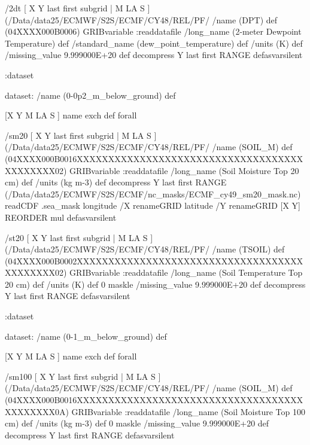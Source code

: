 \begin{ingrid}
/2dt { [ X Y last first subgrid | M LA S ] (/Data/data25/ECMWF/S2S/ECMF/CY48/REL/PF/%
/name (DPT) def
(04XXXX000B0006) GRIBvariable
:readdatafile
/long_name (2-meter Dewpoint Temperature) def
/standard_name (dew_point_temperature) def
/units (K) def
/missing_value 9.999000E+20 def
decompress
Y last first RANGE
} defasvarsilent

:dataset

dataset:
/name (0-0p2_m_below_ground) def

[X Y M LA S ] {name exch def } forall

/sm20 { [ X Y last first subgrid | M LA S ] (/Data/data25/ECMWF/S2S/ECMF/CY48/REL/PF/%
/name (SOIL_M) def
(04XXXX000B0016XXXXXXXXXXXXXXXXXXXXXXXXXXXXXXXXXXXXXXXXXXXX02) GRIBvariable
:readdatafile
/long_name (Soil Moisture Top 20 cm) def
/units (kg m-3) def
decompress
 Y last first RANGE
 (/Data/data25/ECMWF/S2S/ECMF/nc_masks/ECMF_cy49_sm20_mask.nc) readCDF .sea_mask
   longitude /X renameGRID
   latitude /Y renameGRID
   [X Y] REORDER
mul
} defasvarsilent


/st20 { [ X Y last first subgrid | M LA S ] (/Data/data25/ECMWF/S2S/ECMF/CY48/REL/PF/%
/name (TSOIL) def
(04XXXX000B0002XXXXXXXXXXXXXXXXXXXXXXXXXXXXXXXXXXXXXXXXXXXX02) GRIBvariable
:readdatafile
/long_name (Soil Temperature Top 20 cm) def
/units (K) def
0 maskle
/missing_value 9.999000E+20 def
decompress
Y last first RANGE
} defasvarsilent

:dataset

dataset:
/name (0-1_m_below_ground) def

[X Y M LA S ] {name exch def } forall

/sm100 { [ X Y last first subgrid | M LA S ] (/Data/data25/ECMWF/S2S/ECMF/CY48/REL/PF/%
/name (SOIL_M) def
(04XXXX000B0016XXXXXXXXXXXXXXXXXXXXXXXXXXXXXXXXXXXXXXXXXXXX0A) GRIBvariable
:readdatafile
/long_name (Soil Moisture Top 100 cm) def
/units (kg m-3) def
0 maskle
/missing_value 9.999000E+20 def
decompress
Y last first RANGE
} defasvarsilent



\end{ingrid}
